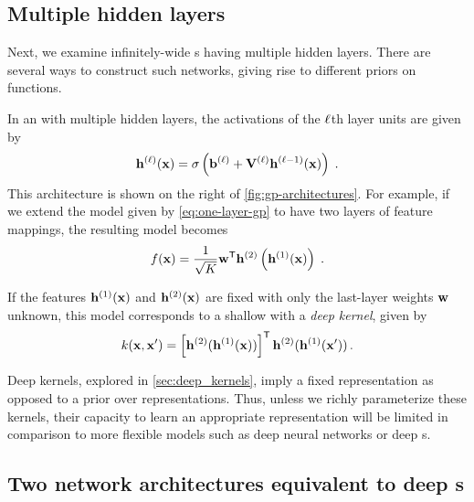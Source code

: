 \subsection{Multiple hidden layers}
Next, we examine infinitely-wide \MLP{}s having multiple hidden layers.
There are several ways to construct such networks, giving rise to different priors on functions.

In an \MLP{} with multiple hidden layers, the activations of the $\ell$th layer units are given by
%
\begin{align}
{\bf{h}}^{(\ell)}({\bf{x}}) = \sigma \left( {\bf{b}}^{(\ell)} + \mathbf{V}^{(\ell)} {\bf{h}}^{(\ell-1)}({\bf{x}}) \right) \;.
\label{eq:nextlayer}
\end{align}
This architecture is shown on the right of \cref{fig:gp-architectures}.
%
For example, if we extend the model given by \cref{eq:one-layer-gp} to have two layers of feature mappings, the resulting model becomes
%
\begin{align}
f({\bf{x}}) = \frac{1}{\sqrt{K}}{\mathbf {{\bf{w}}}}^{\mathsf{T}} {\bf{h}}^{(2)}\left( {\bf{h}}^{(1)}({\bf{x}}) \right) \;.
\label{eq:mutli-layer-nn}
\end{align}

If the features ${\bf{h}}^{(1)}({\bf{x}})$ and ${\bf{h}}^{(2)}({\bf{x}})$ are fixed with only the last-layer weights ${{\bf{w}}}$ unknown, this model corresponds to a shallow \gp{} with a \emph{deep kernel}, given by
\begin{align}
k({\bf{x}}, {\bf{x}}') = \left[ {\bf{h}}^{(2)} ( {\bf{h}}^{(1)}({\bf{x}}) ) \right] ^{\mathsf{T}} {\bf{h}}^{(2)} ({\bf{h}}^{(1)}({\bf{x}}') ) \, .
\end{align}

Deep kernels, explored in \cref{sec:deep_kernels}, imply a fixed representation as opposed to a prior over representations.
Thus, unless we richly parameterize these kernels, their capacity to learn an appropriate representation will be limited in comparison to more flexible models such as deep neural networks or deep \gp{}s. %



 
\subsection{Two network architectures equivalent to deep \sgp{}s}


